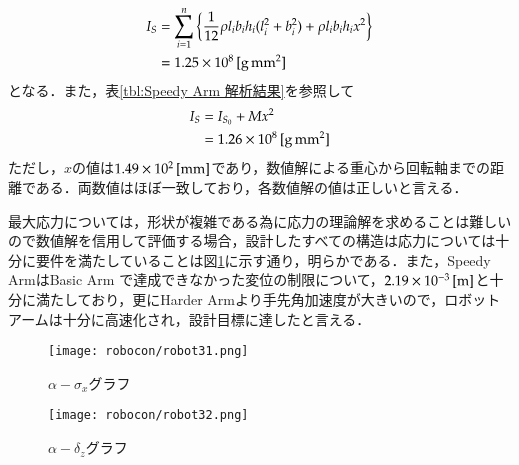 \documentclass[10pt,b5paper,papersize,dvipdfmx]{jsbook}
\begin{document}
\begin{align}
  I_S &=\sum_{i=1}^{n} \left\{ \frac{1}{12} \rho l_ib_ih_i(l_i^2+b_i^2)+\rho l_ib_ih_ix^2 \right\} \notag\\
      &=1.25\times10^8\tani*{g\,mm^2}
\end{align}
となる．また，表\ref{tbl:Speedy Arm 解析結果}を参照して
\begin{align}
  I_S &= I_{S_0}+Mx^2 \notag \\
      &= 1.26\times10^8\tani*{g\,mm^2}
\end{align}
ただし，$x$の値は$1.49\times10^2 \tani*{mm}$であり，数値解による重心から回転軸までの距離である．両数値はほぼ一致しており，各数値解の値は正しいと言える．\par
最大応力については，形状が複雑である為に応力の理論解を求めることは難しいので数値解を信用して評価する場合，設計したすべての構造は応力については十分に要件を満たしていることは図\ref{fig:alpha-sigma_xグラフ}に示す通り，明らかである．また，Speedy ArmはBasic Arm で達成できなかった変位の制限について，$2.19\times10^{-3} \tani*{m}$と十分に満たしており，更にHarder Armより手先角加速度が大きいので，ロボットアームは十分に高速化され，設計目標に達したと言える．

\begin{figure}[htbp]
  \centering
  \texttt{[image: robocon/robot31.png]}
  \caption{$\alpha-\sigma_x$グラフ}
  \label{fig:alpha-sigma_xグラフ}
\end{figure}
\begin{figure}[htbp]
  \centering
  \texttt{[image: robocon/robot32.png]}
  \caption{$\alpha-\delta_z$グラフ}
  \label{fig:alpha-delta_zグラフ}
\end{figure}
\end{document}
